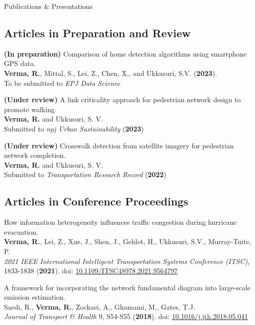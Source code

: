 \documentclass{CV} %
\begin{document}
\begin{rSection}{Publications \& Presentations}
    \subsection*{Articles in Preparation and Review}
    \begin{etaremune}
        \item \textbf{(In preparation)} Comparison of home detection algorithms using smartphone GPS data.
        \\ \textbf{Verma, R.}, Mittal, S., Lei, Z., Chen, X., and Ukkusuri, S.V. (\textbf{2023}).
        \\ To be submitted to \textit{EPJ Data Science}

        \item \textbf{(Under review)} A link criticality approach for pedestrian network design to promote walking.
        \\ \textbf{Verma, R.} and Ukkusuri, S. V.
        \\ Submitted to \textit{npj Urban Sustainability} (\textbf{2023})

        \item \textbf{(Under review)} Crosswalk detection from satellite imagery for pedestrian network completion.
        \\ \textbf{Verma, R.} and Ukkusuri, S. V.
        \\ Submitted to \textit{Transportation Research Record} (\textbf{2022})
    \end{etaremune}

    \subsection*{Articles in Conference Proceedings}
    \begin{etaremune}
        \item How information heterogeneity influences traffic congestion during hurricane evacuation.
        \\ \textbf{Verma, R.}, Lei, Z., Xue, J., Shen, J., Gehlot, H., Ukkusuri, S.V., Murray-Tuite, P.
        \\ \textit{2021 IEEE International Intelligent Transportation Systems Conference (ITSC)}, 1833-1838 (\textbf{2021}). doi: \href{https://ieeexplore.ieee.org/document/9564797}{10.1109/ITSC48978.2021.9564797}

        \item A framework for incorporating the network fundamental diagram into large-scale emission estimation.
        \\ Saedi, R., \textbf{Verma, R.}, Zockaei, A., Ghamami, M., Gates, T.J.
        \\ \textit{Journal of Transport \& Health} 9, S54-S55 (\textbf{2018}). doi: \href{https://www.sciencedirect.com/science/article/abs/pii/S2214140518302263}{10.1016/j.jth.2018.05.041}
    \end{etaremune}
    

\end{rSection}
\end{document}
